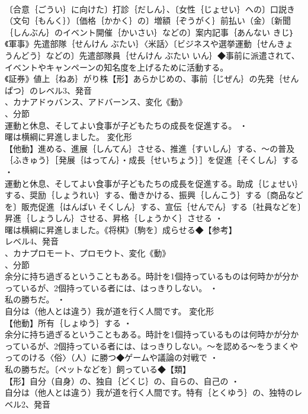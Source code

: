 \documentclass[8pt]{extreport}
\begin{document}
\begin{CJK}{UTF8}{min}
\\	〔合意｛ごうい｝に向けた〕打診｛だしん｝、〔女性｛じょせい｝への〕口説き（文句｛もんく｝）〔価格｛かかく｝の〕増額｛ぞうがく｝前払い（金）〔新聞｛しんぶん｝のイベント開催｛かいさい｝などの〕案内記事｛あんない きじ｝《軍事》先遣部隊｛せんけん ぶたい｝〈米話〉〔ビジネスや選挙運動｛せんきょ うんどう｝などの〕先遣部隊員｛せんけん ぶたい いん｝◆事前に派遣されて、イベントやキャンペーンの知名度を上げるために活動する。
\\	《証券》値上｛ねあ｝がり株【形】あらかじめの、事前｛じぜん｝の先発｛せんぱつ｝のレベル3、発音
\\	、カナアドゥバンス、アドバーンス、変化《動》
\\	、分節
\\	運動と休息、そしてよい食事が子どもたちの成長を促進する。 ・
\\	曙は横綱に昇進しました。	変化形 
\\	【他動】進める、進展｛しんてん｝させる、推進｛すいしん｝する、～の普及｛ふきゅう｝［発展｛はってん｝・成長｛せいちょう｝］を促進｛そくしん｝する ・
\\	運動と休息、そしてよい食事が子どもたちの成長を促進する。助成｛じょせい｝する、奨励｛しょうれい｝する、働きかける、振興｛しんこう｝する〔商品などを〕販売促進｛はんばい そくしん｝する、宣伝｛せんでん｝する〔社員などを〕昇進｛しょうしん｝させる、昇格｛しょうかく｝させる ・
\\	曙は横綱に昇進しました。《将棋》〔駒を〕成らせる◆【参考】
\\	レベル4、発音
\\	、カナプロモート、プロモウト、変化《動》
\\	、分節
\\	余分に持ち過ぎるということもある。時計を1個持っているものは何時かが分かっているが、2個持っている者には、はっきりしない。 ・
\\	私の勝ちだ。 ・
\\	自分は（他人とは違う）我が道を行く人間です。	変化形 
\\	【他動】所有｛しょゆう｝する ・
\\	余分に持ち過ぎるということもある。時計を1個持っているものは何時かが分かっているが、2個持っている者には、はっきりしない。～を認める～をうまくやってのける〈俗〉（人）に勝つ◆ゲームや議論の対戦で ・
\\	私の勝ちだ。〔ペットなどを〕飼っている◆【類】
\\	【形】自分（自身）の、独自｛どくじ｝の、自らの、自己の ・
\\	自分は（他人とは違う）我が道を行く人間です。特有｛とくゆう｝の、独特のレベル2、発音

\end{CJK}
\end{document}
